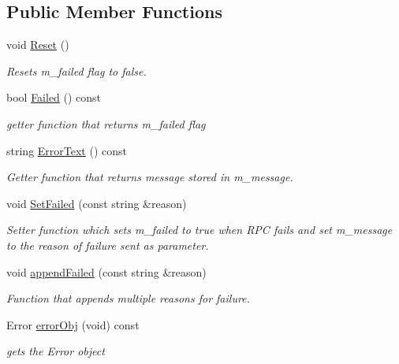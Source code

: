 \subsection*{Public Member Functions}
\begin{DoxyCompactItemize}
\item 
\mbox{\label{classcoappbrpc_1_1ControllerRPC_aac8d7a0e52a017d60a411a462bad6d91}} 
void \hyperlink{classcoappbrpc_1_1ControllerRPC_aac8d7a0e52a017d60a411a462bad6d91}{Reset} ()
\begin{DoxyCompactList}\small\item\em Resets m\+\_\+failed flag to false. \end{DoxyCompactList}\item 
\mbox{\label{classcoappbrpc_1_1ControllerRPC_a20a3b119687bea2ac836db07a3b04287}} 
bool \hyperlink{classcoappbrpc_1_1ControllerRPC_a20a3b119687bea2ac836db07a3b04287}{Failed} () const
\begin{DoxyCompactList}\small\item\em getter function that returns m\+\_\+failed flag \end{DoxyCompactList}\item 
\mbox{\label{classcoappbrpc_1_1ControllerRPC_a96035415234221d2972a3f2f790275ce}} 
string \hyperlink{classcoappbrpc_1_1ControllerRPC_a96035415234221d2972a3f2f790275ce}{Error\+Text} () const
\begin{DoxyCompactList}\small\item\em Getter function that returns message stored in m\+\_\+message. \end{DoxyCompactList}\item 
void \hyperlink{classcoappbrpc_1_1ControllerRPC_a3d91a6d0ba16232c531c3313e4412212}{Set\+Failed} (const string \&reason)
\begin{DoxyCompactList}\small\item\em Setter function which sets m\+\_\+failed to true when R\+PC fails and set m\+\_\+message to the reason of failure sent as parameter. \end{DoxyCompactList}\item 
void \hyperlink{classcoappbrpc_1_1ControllerRPC_a480586532b344e3ca8da2d2519ba593f}{append\+Failed} (const string \&reason)
\begin{DoxyCompactList}\small\item\em Function that appends multiple reasons for failure. \end{DoxyCompactList}\item 
\mbox{\label{classcoappbrpc_1_1ControllerRPC_aab955bb22c799e5d544b3083fe64c7d7}} 
Error \hyperlink{classcoappbrpc_1_1ControllerRPC_aab955bb22c799e5d544b3083fe64c7d7}{error\+Obj} (void) const
\begin{DoxyCompactList}\small\item\em gets the Error object \end{DoxyCompactList}\end{DoxyCompactItemize}


